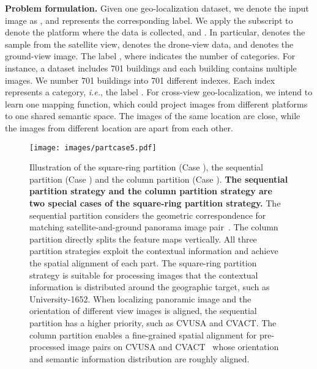 \documentclass[journal]{IEEEtran}
\def\ie{\emph{i.e.}}
\begin{document}
\textbf{Problem formulation.} Given one geo-localization dataset, we denote the input image as , and  represents the corresponding label. We apply the subscript  to denote the platform where the data  is collected, and . 
In particular,  denotes the sample from  the satellite view,  denotes the drone-view data, and  denotes the ground-view image. The label
, where  indicates the number of categories. For instance, a dataset includes 701 buildings and each building contains multiple images. We number 701 buildings into 701 different indexes. Each index represents a category, \ie, the label . For cross-view geo-localization, we intend to learn one mapping function, which could project images from different platforms to one shared semantic space. The images of the same location are close, while the images from different location are apart from each other. 


\begin{figure}[htbp]
  \centering
  \texttt{[image: images/partcase5.pdf]}
  \caption{Illustration of the square-ring partition (Case \uppercase\expandafter{}), the sequential partition (Case \uppercase\expandafter{}) and the column partition (Case \uppercase\expandafter{}). \textbf{The sequential partition strategy and the column partition strategy are two special cases of the square-ring partition strategy.} The sequential partition considers the geometric correspondence for matching  satellite-and-ground panorama image pair~\cite{shi_spatial-aware_nodate,Shi_2020_CVPR}. The column partition directly splits the feature maps vertically. All three partition strategies exploit the contextual information and achieve the spatial alignment of each part. The square-ring partition strategy is suitable for processing images that the contextual information is distributed around the geographic target, such as University-1652. When localizing panoramic image and the orientation of different view images is aligned, the sequential partition has a higher priority, such as CVUSA and CVACT. The column partition enables a fine-grained spatial alignment for pre-processed image pairs on CVUSA and CVACT~\cite{shi_spatial-aware_nodate,shi_optimal_nodate} whose orientation and semantic information distribution are roughly aligned.
 }
  \label{fig:visual}
\end{figure}
\end{document}
